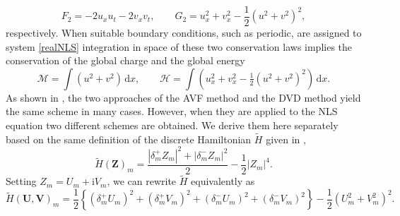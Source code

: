 \documentclass[twoside]{article}
\numberwithin{equation}{section}
\begin{document}
\begin{equation}\label{energy} 
F_2=-2u_xu_t-2v_xv_t,\qquad G_2=u^2_x+v^2_x-\frac{1}2(u^2+v^2)^2,
\end{equation}
respectively. 
When suitable boundary conditions, such as periodic, are assigned to system \eqref{realNLS} integration in space of these two conservation laws implies the conservation of the global charge and the global energy
$$\mathcal{M}=\int (u^2+v^2)\,\mathrm{d}x,\qquad \mathcal{H}=\int (u_x^2 + v_x^2 -\tfrac{1}2(u^2+v^2)^2)\,\mathrm{d}x.$$
As shown in \cite{Dahlby}, the two approaches of the AVF method and the DVD method yield the same scheme in many cases. However, when they are applied to the NLS equation two different schemes are obtained. We derive them here separately based on the same definition of the discrete Hamiltonian $\widetilde{H}$ given in \cite{Matsuo}, 
\begin{equation}\label{NLSsdH}
\widetilde{H}(\mathbf Z)_m=\frac{|\delta_m^+Z_m|^2+|\delta_m^-Z_m|^2}2-\frac{1}2|Z_m|^4.
\end{equation}
Setting $Z_m=U_m+\mathrm{i}V_m$, we can rewrite $\widetilde{H}$ equivalently as
\begin{equation}\label{realNLSsdH}
\widetilde{H}(\mathbf U,\mathbf V)_m=\frac{1}2\left\{(\delta_m^+U_{m})^2+(\delta_m^+V_{m})^2+(\delta_m^-U_{m})^2+(\delta_m^-V_{m})^2\right\}-\frac{1}2(U_{m}^2+V_{m}^2)^2.
\end{equation}
\end{document}
